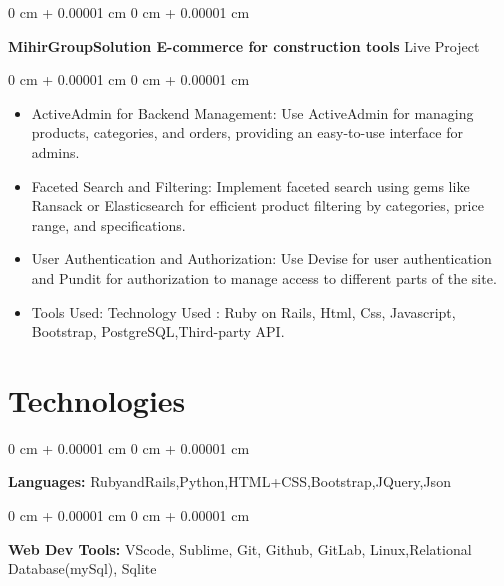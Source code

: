 \documentclass[10pt, letterpaper]{article}
\newenvironment{highlights}{
    \begin{itemize}[
        topsep=0.10 cm,
        parsep=0.10 cm,
        partopsep=0pt,
        itemsep=0pt,
        leftmargin=0 cm + 10pt
    ]
}{
    \end{itemize}
} %
\newenvironment{onecolentry}{
    \begin{adjustwidth}{
        0 cm + 0.00001 cm
    }{
        0 cm + 0.00001 cm
    }
}{
    \end{adjustwidth}
} %
\newenvironment{twocolentry}[2][]{
    \onecolentry
    \def\secondColumn{#2}
    \setcolumnwidth{\fill, 4.5 cm}
    \begin{paracol}{2}
}{
    \switchcolumn \raggedleft \secondColumn
    \end{paracol}
    \endonecolentry
} %
\begin{document}
        \vspace{0.2 cm}

        \begin{twocolentry}{
          Live Project
        }
            \textbf{MihirGroupSolution  E-commerce for construction tools}\end{twocolentry}

        \vspace{0.10 cm}
        \begin{onecolentry}
            \begin{highlights}
                \item ActiveAdmin for Backend Management: Use ActiveAdmin for managing products, categories, and orders, providing an easy-to-use interface for admins.
                \item Faceted Search and Filtering: Implement faceted search using gems like Ransack or Elasticsearch for efficient product filtering by categories, price range, and specifications.
               \item User Authentication and Authorization: Use Devise for user authentication and Pundit for authorization to manage access to different parts of the site.
                \item Tools Used: Technology Used : Ruby on Rails, Html, Css, Javascript, Bootstrap, PostgreSQL,Third-party API.
            \end{highlights}
        \end{onecolentry}


    
    \section{Technologies}



        
        \begin{onecolentry}
            \textbf{Languages:} RubyandRails,Python,HTML+CSS,Bootstrap,JQuery,Json
        \end{onecolentry}

        \vspace{0.2 cm}

        \begin{onecolentry}
            \textbf{Web Dev Tools:} VScode, Sublime, Git, Github, GitLab, Linux,Relational Database(mySql), Sqlite
        \end{onecolentry}
     

    
\end{document}
